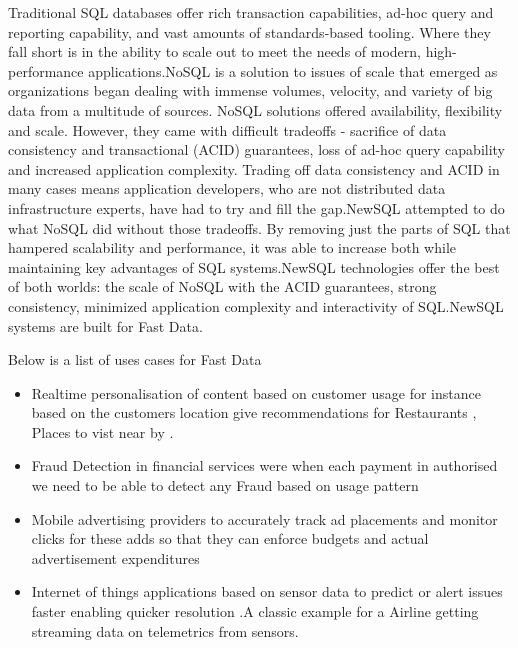 \documentclass[9pt,twocolumn,twoside]{styles/osajnl}
\begin{document}
Traditional SQL databases offer rich transaction capabilities, ad-hoc query and reporting capability, and vast amounts of standards-based tooling. Where they fall short is in the ability to scale out to meet the needs of modern, high-performance applications.NoSQL is  a solution to issues of scale that emerged as organizations began dealing with immense volumes, velocity, and variety of big data from a multitude of sources. NoSQL solutions offered availability, flexibility and scale. However, they came with difficult tradeoffs - sacrifice of data consistency and transactional (ACID) guarantees, loss of ad-hoc query capability and increased application complexity. Trading off data consistency and ACID in many cases means application developers, who are not distributed data infrastructure experts, have had to try and fill the gap.NewSQL attempted to do what NoSQL did without those tradeoffs. By removing just the parts of SQL that hampered scalability and performance, it was able to increase both while maintaining key advantages of SQL systems.NewSQL technologies offer the best of both worlds: the scale of NoSQL with the ACID guarantees, strong consistency, minimized application complexity and interactivity of SQL.NewSQL systems are built for Fast Data.\cite{www-FastData}

Below is a list of uses cases for Fast Data 
\begin{itemize}
\renewcommand{\labelitemi}{\scriptsize$\square$} 
\item Realtime personalisation of content based on customer usage for instance based on the customers location give recommendations for Restaurants , Places to vist near by .
\item Fraud Detection in financial services were when each payment in authorised we need to be able to detect any Fraud based on usage pattern 
\item Mobile advertising providers to accurately track ad placements and monitor clicks for these adds so that they can enforce budgets and actual advertisement expenditures
\item Internet of things applications based on sensor data to predict or alert issues faster enabling quicker resolution .A classic example for a Airline getting streaming data on telemetrics from sensors.
\end{itemize}



\end{document}
